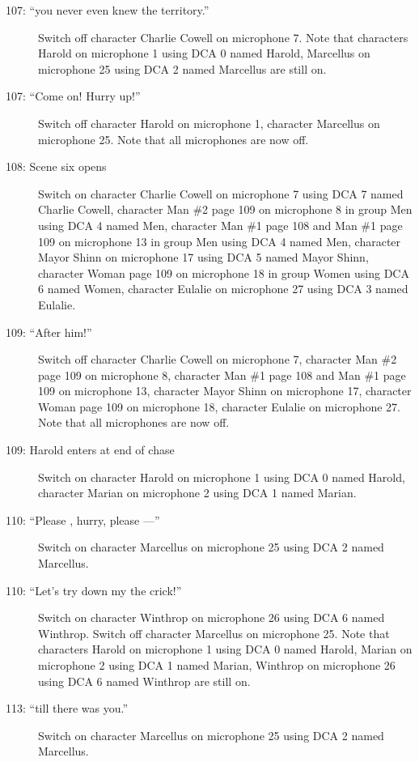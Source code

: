 \begin{description}
\item[107: ``you never even knew the territory.'']
Switch off character Charlie Cowell on microphone 7. Note that characters Harold on microphone 1 using DCA 0 named Harold, Marcellus on microphone 25 using DCA 2 named Marcellus are still on.  

\item[107: ``Come on! Hurry up!'']
Switch off character Harold on microphone 1, character Marcellus on microphone 25. Note that all microphones are now off.

\item[108: Scene six opens]
Switch on character Charlie Cowell on microphone 7 using DCA 7 named Charlie Cowell, character Man \#2 page 109 on microphone 8 in group Men using DCA 4 named Men, character Man \#1 page 108 and Man \#1 page 109 on microphone 13 in group Men using DCA 4 named Men, character Mayor Shinn on microphone 17 using DCA 5 named Mayor Shinn, character Woman page 109 on microphone 18 in group Women using DCA 6 named Women, character Eulalie on microphone 27 using DCA 3 named Eulalie. 

\item[109: ``After him!'']
Switch off character Charlie Cowell on microphone 7, character Man \#2 page 109 on microphone 8, character Man \#1 page 108 and Man \#1 page 109 on microphone 13, character Mayor Shinn on microphone 17, character Woman page 109 on microphone 18, character Eulalie on microphone 27. Note that all microphones are now off.

\item[109: Harold enters at end of chase]
Switch on character Harold on microphone 1 using DCA 0 named Harold, character Marian on microphone 2 using DCA 1 named Marian. 

\item[110: ``Please , hurry, please ---'']
Switch on character Marcellus on microphone 25 using DCA 2 named Marcellus. 

\item[110: ``Let's try down my the crick!'']
Switch on character Winthrop on microphone 26 using DCA 6 named Winthrop. Switch off character Marcellus on microphone 25. Note that characters Harold on microphone 1 using DCA 0 named Harold, Marian on microphone 2 using DCA 1 named Marian, Winthrop on microphone 26 using DCA 6 named Winthrop are still on.  

\item[113: ``till there was you.'']
Switch on character Marcellus on microphone 25 using DCA 2 named Marcellus. 


\end{description}
